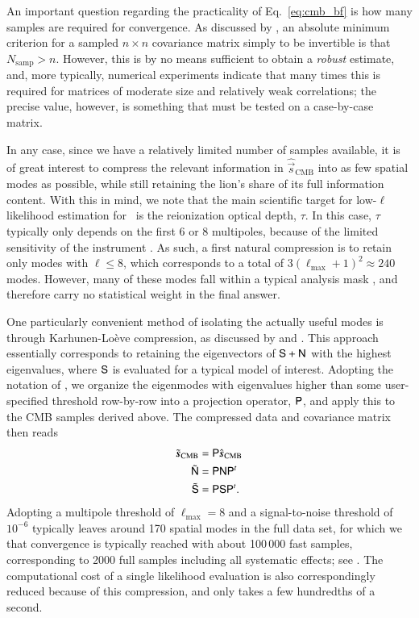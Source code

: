 \documentclass[onecolumn]{aa}
\newcommand{\s}[0]{\vec{s}}
\newcommand{\N}[0]{\tens{N}}
\renewcommand{\S}[0]{\tens{S}}
\renewcommand{\P}[0]{\tens{P}}
\begin{document}
An important question regarding the practicality of
Eq.~\eqref{eq:cmb_bf} is how many samples are required for
convergence. As discussed by \citet{sellentin2016}, an absolute
minimum criterion for a sampled $n\times n$ covariance matrix simply
to be invertible is that $N_{\mathrm{samp}} > n$. However, this is by
no means sufficient to obtain a \emph{robust} estimate, and, more
typically, numerical experiments indicate that many times this is
required for matrices of moderate size and relatively weak
correlations; the precise value, however, is something that must be
tested on a case-by-case matrix.

In any case, since we have a relatively limited number of samples
available, it is of great interest to compress the relevant
information in $\hat{\s}_{\mathrm{CMB}}$ into as few spatial modes as
possible, while still retaining the lion's share of its full
information content. With this in mind, we note that the main
scientific target for low-$\ell$ likelihood estimation for \Planck\ is
the reionization optical depth, $\tau$. In this case, $\tau$
typically only depends on the first 6 or 8 multipoles, because of the
limited sensitivity of the instrument \citep{planck2016-l05}. As such,
a first natural compression is to retain only modes with $\ell \le 8$,
which corresponds to a total of $3(\ell_{\mathrm{max}}+1)^2\approx
240$ modes. However, many of these modes fall within a typical
analysis mask \citep{bp11}, and therefore carry no statistical weight
in the final answer.

One particularly convenient method of isolating the actually useful
modes is through Karhunen-Lo\`eve compression, as discussed by
\citet{tegmark1997} and \citet{gjerlow2015}. This approach essentially
corresponds to retaining the eigenvectors of $\S+\N$ with the highest
eigenvalues, where $\S$ is evaluated for a typical model of
interest. Adopting the notation of \citet{gjerlow2015}, we organize
the eigenmodes with eigenvalues higher than some user-specified
threshold row-by-row into a projection operator, $\P$, and apply this
to the CMB samples derived above. The compressed data and covariance
matrix then reads
\begin{align}
  \tilde{\s}_{\mathrm{CMB}} &= \P\hat{\s}_{\mathrm{CMB}}\\
  \tilde{\N} &= \P\N\P^t \\
  \tilde{\S} &= \P\S\P^t.
\end{align}
Adopting a multipole threshold of $\ell_{\mathrm{max}}=8$ and a
signal-to-noise threshold of $10^{-6}$ typically leaves around 170
spatial modes in the full data set, for which we that convergence is
typically reached with about 100\,000 fast samples, corresponding to
2000 full samples including all systematic effects; see
\citet{bp12}. The computational cost of a single likelihood evaluation
is also correspondingly reduced because of this compression, and only
takes a few hundredths of a second.
\end{document}
